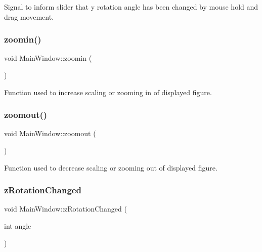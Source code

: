 Signal to inform slider that y rotation angle has been changed by mouse hold and drag movement. 

\mbox{\label{classMainWindow_a571790691bad25c9861c0c487ba0ce43}} 
\subsubsection{\texorpdfstring{zoomin()}{zoomin()}}
{\footnotesize\ttfamily void Main\+Window\+::zoomin (\begin{DoxyParamCaption}{ }\end{DoxyParamCaption})}



Function used to increase scaling or zooming in of displayed figure. 

\mbox{\label{classMainWindow_ac54938e78f6b39c6b62cee61d75e8c22}} 
\subsubsection{\texorpdfstring{zoomout()}{zoomout()}}
{\footnotesize\ttfamily void Main\+Window\+::zoomout (\begin{DoxyParamCaption}{ }\end{DoxyParamCaption})}



Function used to decrease scaling or zooming out of displayed figure. 

\mbox{\label{classMainWindow_a08d6c28ab348ab6626abf0168e73cd1d}} 
\subsubsection{\texorpdfstring{z\+Rotation\+Changed}{zRotationChanged}}
{\footnotesize\ttfamily void Main\+Window\+::z\+Rotation\+Changed (\begin{DoxyParamCaption}\item[{int}]{angle }\end{DoxyParamCaption})\hspace{0.3cm}{\ttfamily [signal]}}




